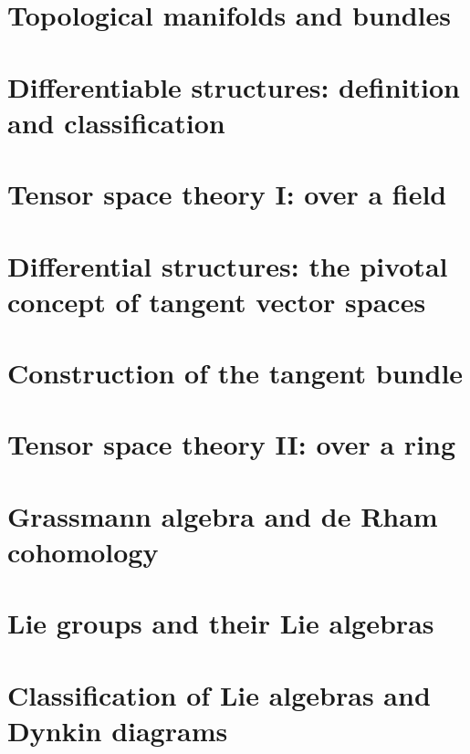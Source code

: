 \documentclass[
11pt, %
a4paper, %
twoside, %
headinclude,footinclude, %
]{scrartcl}
\begin{document}
\section{Topological manifolds and bundles}

\newpage

\section{Differentiable structures: definition and classification}

\newpage

\section{Tensor space theory I: over a field}



\section{Differential structures: the pivotal concept of tangent vector spaces}



\section{Construction of the tangent bundle}



\section{Tensor space theory II: over a ring}



\section{Grassmann algebra and de Rham cohomology}



\section{Lie groups and their Lie algebras}



\section{Classification of Lie algebras and Dynkin diagrams}
\end{document}

